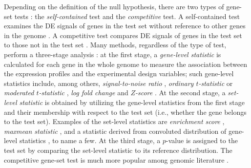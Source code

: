 	Depending on the definition of the null hypothesis, there are two types of gene-set tests
	\citep{goeman2007analyzing}: the \textit{self-contained} test and the \textit{competitive} 
	test. A self-contained test examines the DE signals of genes in the test set without reference 
	to other genes in the genome 	
	\citep{goeman2005testing,goeman2004global,huang2013gene,tsai2009multivariate,wu2010roast}. A 
	competitive test compares DE signals of genes in the test set to those not in the test set 
	\citep{tian2005discovering,wu2012camera,yaari2013quantitative}. Many methods, regardless of the 
	type of test, perform a three-stage analysis
	\citep{khatri2012ten}: at the first stage, a \textit{gene-level statistic} is calculated for 
	each gene in the whole genome to measure the association between the expression profiles and the
	experimental design variables; such gene-level statistics include, among others,
	\textit{signal-to-noise ratio} \citep{subramanian2005gene}, \textit{ordinary $t$-statistic}
	\citep{tian2005discovering} or \textit{moderated $t$-statistic} \citep{Smyth2004moderated},
	\textit{log fold change} \citep{kim2005page} and \textit{$Z$-score} 
	\citep{efron2007correlation}. At
	the second stage, a \textit{set-level statistic} is obtained by utilizing the gene-level 
	statistics
	from the first stage and their membership with respect to the test set (i.e., whether the gene
	belongs to the test set). Examples of the set-level statistics are \textit{enrichment score}
	\citep{subramanian2005gene}, \textit{maxmean statistic} \citep{efron2007testing}, and a 
	statistic derived from convoluted distribution of gene-level statistics 
	\citep{yaari2013quantitative}, to name
	a few. At the third stage, a $p$-value is assigned to the test set by comparing the set-level
	statistic to its reference distribution. The competitive gene-set test is much more popular 
	among genomic literature \citep{gatti2010heading,goeman2007analyzing}.  
	
	
